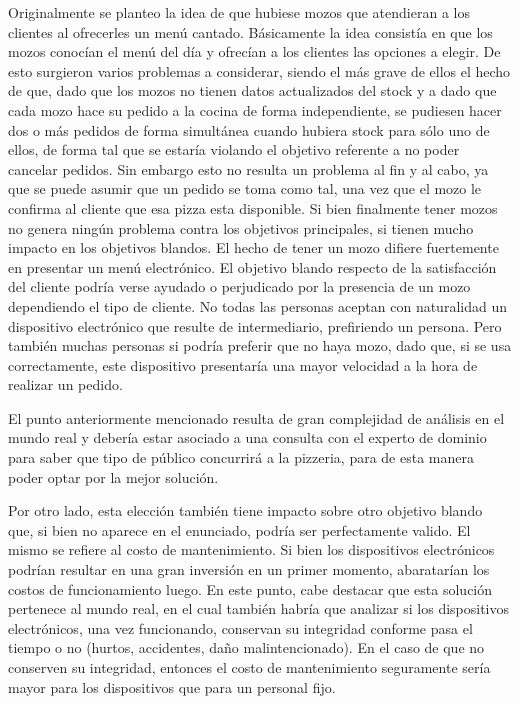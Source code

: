 \documentclass[a4paper,10pt]{article}
\begin{document}
Originalmente se planteo la idea de que hubiese mozos que atendieran a los clientes al ofrecerles un menú cantado.
 Básicamente la idea consistía en que los mozos conocían el menú del día y ofrecían a los clientes las opciones a elegir.
 De esto surgieron varios problemas a considerar, siendo el más grave de ellos el hecho de que, dado que los mozos no tienen datos
 actualizados del stock y a dado que cada mozo hace su pedido a la cocina de forma independiente, se pudiesen hacer dos o más pedidos de
 forma simultánea cuando hubiera stock para sólo uno de ellos, de forma tal que se estaría violando el objetivo referente a no poder 
cancelar pedidos. Sin embargo esto no resulta un problema al fin y al cabo, ya que se puede asumir que un pedido se toma como tal, una vez
que el mozo le confirma al cliente que esa pizza esta disponible. Si bien finalmente tener mozos no genera ning\'un problema contra los objetivos
principales, si tienen mucho impacto en los objetivos blandos. El hecho de tener un mozo difiere fuertemente en presentar un men\'u electr\'onico.
El objetivo blando respecto de la satisfacci\'on del cliente podr\'ia verse ayudado o perjudicado por la presencia de un mozo dependiendo el
tipo de cliente. No todas las personas aceptan con naturalidad un dispositivo electr\'onico que resulte de intermediario, prefiriendo un persona. Pero
tambi\'en muchas personas si podr\'ia preferir que no haya mozo, dado que, si se usa correctamente, este dispositivo presentar\'ia una mayor velocidad
a la hora de realizar un pedido.

El punto anteriormente mencionado resulta de gran complejidad de an\'alisis en el mundo real y deber\'ia estar asociado a una consulta con el
experto de dominio para saber que tipo de p\'ublico concurrir\'a a la pizzeria, para de esta manera poder optar por la mejor soluci\'on.

Por otro lado, esta elecci\'on tambi\'en tiene impacto sobre otro objetivo blando que, si bien no aparece en el enunciado, podr\'ia ser perfectamente valido.
El mismo se refiere al costo de mantenimiento. Si bien los dispositivos electr\'onicos podr\'ian resultar en una gran inversi\'on en un primer momento,
abaratar\'ian los costos de funcionamiento luego. En este punto, cabe destacar que esta soluci\'on pertenece al mundo real, en el cual tambi\'en
habr\'ia que analizar si los dispositivos electr\'onicos, una vez funcionando, conservan su integridad conforme pasa el tiempo o no (hurtos, accidentes, da\~{n}o malintencionado).
En el caso de que no conserven su integridad, entonces el costo de mantenimiento seguramente ser\'ia mayor para los dispositivos que para un personal fijo.
\end{document}
